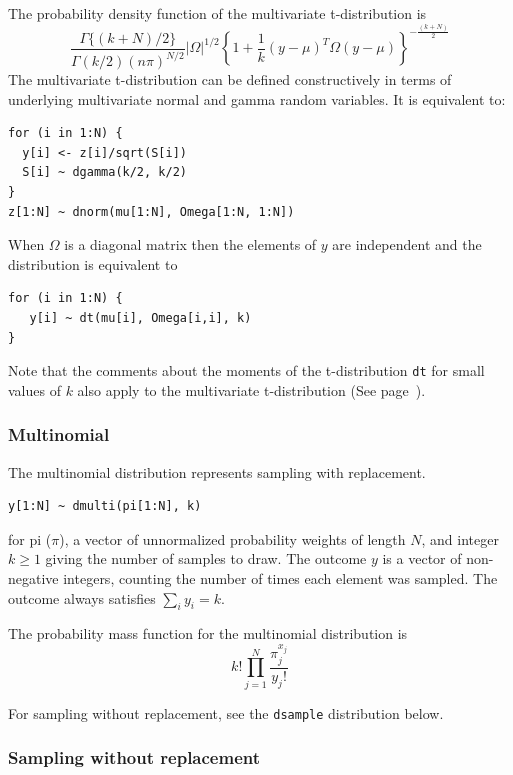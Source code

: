 \documentclass[11pt, a4paper, titlepage]{report}
\begin{document}
{The probability density function of the multivariate t-distribution is
\[
\frac{\textstyle \Gamma \{(k+N)/2\}}{\textstyle \Gamma(k/2) (n\pi)^{N/2}}
|\Omega|^{1/2}
\left\{1 + \frac{1}{k} (y - \mu)^T \Omega (y - \mu) \right\}^{-\frac{(k+N)}{2}}
\]
The multivariate t-distribution can be defined constructively in terms
of underlying multivariate normal and gamma random variables. It is
equivalent to:
\begin{verbatim}
for (i in 1:N) {
  y[i] <- z[i]/sqrt(S[i])
  S[i] ~ dgamma(k/2, k/2)
}
z[1:N] ~ dnorm(mu[1:N], Omega[1:N, 1:N])
\end{verbatim}

When $\Omega$ is a diagonal matrix then the elements of $y$ are independent
and the distribution is equivalent to 
\begin{verbatim}
for (i in 1:N) {
   y[i] ~ dt(mu[i], Omega[i,i], k)
}
\end{verbatim}
Note that the comments about the moments of the t-distribution \texttt{dt} for
small values of $k$ also apply to the multivariate t-distribution (See
page~\pageref{bugs:dt}).

\subsubsection{Multinomial}
\label{bugs:dmulti}

The multinomial distribution represents sampling with replacement. 
\begin{verbatim}
y[1:N] ~ dmulti(pi[1:N], k)
\end{verbatim}
for pi ($\pi$), a vector of unnormalized probability weights of length $N$,
and integer $k \geq 1$ giving the number of samples to draw. The outcome
$y$ is a vector of non-negative integers, counting the number of times
each element was sampled. The outcome always satisfies $\sum_i y_i = k$.

The probability mass function for the multinomial distribution is
\[
k! \prod_{j=1}^N
\frac{\textstyle \pi_j^{x_j}}{\textstyle y_j!}
\]

For sampling without replacement, see the \texttt{dsample}
distribution below.
      

\subsubsection{Sampling without replacement}
\label{bugs:dsample}

}
\end{document}
